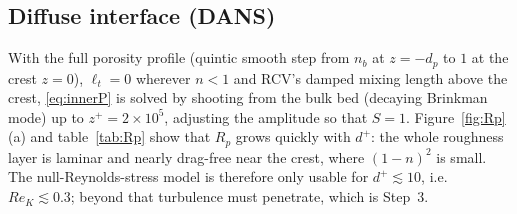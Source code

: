 \documentclass[10pt,a4paper]{article}
\newcommand{\Rp}{R_p}
\begin{document}
\subsection{Diffuse interface (DANS)}
With the full porosity profile (quintic smooth step from $n_b$ at $z=-d_p$ to $1$ at the crest $z=0$), $\ell_t=0$ wherever $n<1$ and RCV's damped mixing length above the crest, \eqref{eq:innerP} is solved by shooting from the bulk bed (decaying Brinkman mode) up to $z^+=2\times10^5$, adjusting the amplitude so that $S=1$. Figure~\ref{fig:Rp}(a) and table~\ref{tab:Rp} show that $\Rp$ grows quickly with $d^+$: the whole roughness layer is laminar and nearly drag-free near the crest, where $(1-n)^2$ is small. The null-Reynolds-stress model is therefore only usable for $d^+\lesssim10$, i.e.\ $Re_K\lesssim0.3$; beyond that turbulence must penetrate, which is Step~3.

\end{document}
